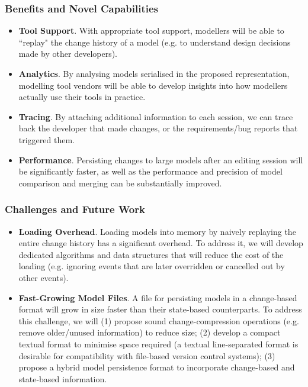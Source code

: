 \documentclass{beamer}
\begin{document}
\begin{frame}
\frametitle{Benefits and Novel Capabilities}
\begin{itemize}
\item \textbf{Tool Support}. With appropriate tool support, modellers will be able to ``replay" the change history of a model (e.g. to understand design decisions made by other developers). 
\item \textbf{Analytics}. By analysing models serialised in the proposed representation, modelling tool vendors will be able to develop insights into how modellers actually use their tools in practice.
\item \textbf{Tracing}. By attaching additional information to each session, we can trace back the developer that made changes, or the requirements/bug reports that triggered them.
\item \textbf{Performance}. Persisting changes to large models after an editing session will be significantly faster, as well as the performance and precision of model comparison and merging can be substantially improved.
\end{itemize}
\end{frame}

\begin{frame}
\frametitle{Challenges and Future Work}
\begin{itemize}
\item \textbf{Loading Overhead}. Loading models into memory by naively replaying the entire change history has a significant overhead. To address it, we will develop dedicated algorithms and data structures that will reduce the cost of the loading (e.g. ignoring events that are later overridden or cancelled out by other events). 

\item \textbf{Fast-Growing Model Files}. A file for persisting models in a change-based format will grow in size faster than their state-based counterparts. To address this challenge, we will (1) propose sound change-compression operations (e.g. remove older/unused information) to reduce size; (2) develop a compact textual format to minimise space required (a textual line-separated format is desirable for compatibility with file-based version control systems); (3) propose a hybrid model persistence format to incorporate change-based and state-based information. 
\end{itemize}
\end{frame}
\end{document}
